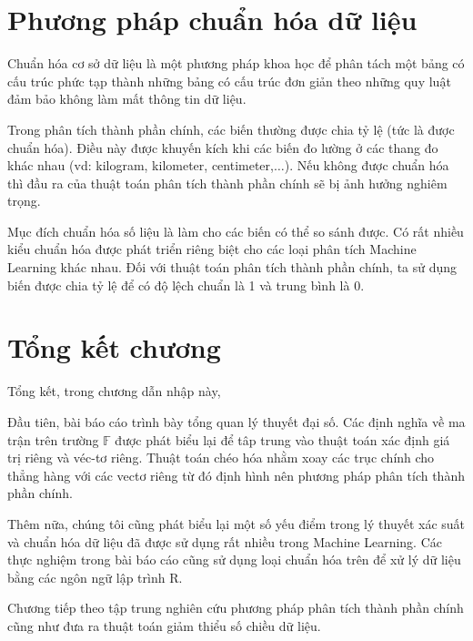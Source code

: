 \documentclass[../thesis.tex]{subfiles}
\begin{document}

\section{Phương pháp chuẩn hóa dữ liệu}

Chuẩn hóa cơ sở dữ liệu là một phương pháp khoa học để phân tách một bảng có cấu trúc phức tạp thành những bảng có cấu trúc đơn giản theo những quy luật đảm bảo không làm mất thông tin dữ liệu.

Trong phân tích thành phần chính, các biến thường được chia tỷ lệ (tức là được chuẩn hóa). Điều này được khuyến kích khi các biến đo lường ở các thang đo khác nhau (vd: kilogram, kilometer, centimeter,$ \ldots $). Nếu không được chuẩn hóa thì đầu ra của thuật toán phân tích thành phần chính sẽ bị ảnh hưởng nghiêm trọng.

Mục đích chuẩn hóa số liệu là làm cho các biến có thể so sánh được. Có rất nhiều kiểu chuẩn hóa được phát triển riêng biệt cho các loại phân tích Machine Learning  khác nhau. Đối với thuật toán phân tích thành phần chính, ta sử dụng biến được chia tỷ lệ để có độ lệch chuẩn là 1 và trung bình là 0.


\newpage
\section*{Tổng kết chương}

Tổng kết, trong chương dẫn nhập này, 

Đầu tiên, bài báo cáo trình bày tổng quan lý thuyết đại số. Các định nghĩa về ma trận trên trường $ \mathbb{F} $ được phát biểu lại để tâp trung vào thuật toán xác định giá trị riêng và véc-tơ riêng. Thuật toán chéo hóa nhằm xoay các trục chính cho thẳng hàng với các vectơ riêng từ đó định hình nên phương pháp phân tích thành phần chính.

Thêm nữa, chúng tôi cũng phát biểu lại một số yếu điểm trong lý thuyết xác suất và chuẩn hóa dữ liệu đã được sử dụng rất nhiều trong Machine Learning. Các thực nghiệm trong bài báo cáo cũng sử dụng loại chuẩn hóa trên để xử lý dữ liệu bằng các ngôn ngữ lập trình R.  

Chương tiếp theo tập trung nghiên cứu phương pháp phân tích thành phần chính cũng như đưa ra thuật toán giảm thiểu số chiều dữ liệu.
\end{document}
